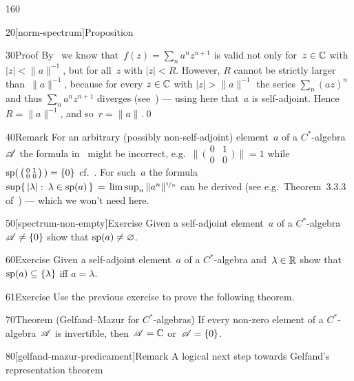\begin{parsec}{160}
\begin{point}{20}[norm-spectrum]{Proposition}
\begin{point}{30}{Proof}
By~
we know that~$f(z)=\sum_n a^nz^{n+1}$
is valid not only for~$z\in \mathbb{C}$ with $\left|z\right|< \|a\|^{-1}$,
but for all~$z$ with $\left|z\right|< R$.
However, $R$ cannot be strictly larger than~$\|a\|^{-1}$,
because for every $z\in\mathbb{C}$ with $\left|z\right|>\|a\|^{-1}$
the series $\sum_n(az)^n$ 
and thus $\sum_n a^n{z}^{n+1}$ diverges (see~)
--- using here that~$a$ is self-adjoint.
Hence~$R=\|a\|^{-1}$, and so~$r=\|a\|$.\qed
\end{point}
\end{point}
\begin{point}{40}{Remark}%
For an arbitrary (possibly non-self-adjoint)
element~$a$ of a $C^*$-algebra~$\mathscr{A}$
the formula in~
might be incorrect, e.g.~$\bigl\|\,\bigl(\begin{smallmatrix}
0& 1\\
0 & 0
\end{smallmatrix}\bigr)\,\|=1$
while 
$\mathrm{sp}(\,\bigl(\begin{smallmatrix}
0& 1\\
0 & 0
\end{smallmatrix}\bigr)\,)=\{0\}$
cf.~.
For such~$a$
the formula
$\sup\{\,\left|\lambda\right|\colon\, \lambda\in \mathrm{sp}(a)\,\}
\,=\, \limsup_n \|a^n\|^{\nicefrac{1}{n}}$
	can be derived (see e.g.~Theorem~3.3.3 of~\cite{kr}) --- 
	which we won't need here.
\end{point}
\begin{point}{50}[spectrum-non-empty]{Exercise}%
Given a self-adjoint element~$a$ of a $C^*$-algebra~$\mathscr{A}\neq\{0\}$
show that $\mathrm{sp}(a)\neq \varnothing$.
\end{point}
\begin{point}{60}{Exercise}%
Given a self-adjoint element~$a$ of a $C^*$-algebra
and~$\lambda\in\mathbb{R}$
show that $\mathrm{sp}(a) \subseteq\{\lambda\}$ iff $a=\lambda$.
\end{point}
\begin{point}{61}{Exercise}%
Use the previous exercise to prove the following theorem.
\end{point}
\begin{point}{70}{Theorem (Gelfand--Mazur for $C^*$-algebras)}%
%
If every non-zero element of a $C^*$-algebra~$\mathscr{A}$
is invertible, then~$\mathscr{A}=\mathbb{C}$ or~$\mathscr{A}=\{0\}$.
\end{point}
\begin{point}{80}[gelfand-mazur-predicament]{Remark}%
A logical next step
towards Gelfand's representation theorem

\end{point}
\end{parsec}
